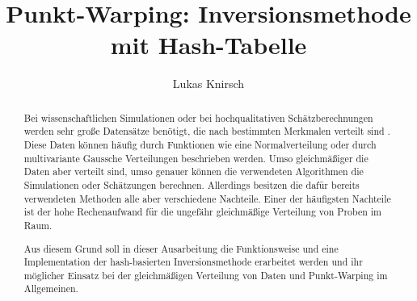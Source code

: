 \documentclass[a4paper]{IEEEtran}
\title{Punkt-Warping: Inversionsmethode mit Hash-Tabelle}
\author{Lukas Knirsch}
\begin{document}
\maketitle

\begin{abstract}
Bei wissenschaftlichen Simulationen oder bei hochqualitativen Schätzberechnungen werden sehr große Datensätze benötigt, 
die nach bestimmten Merkmalen verteilt sind \cite{frisch_hanebeck-deterministic_gaussian_sampling-2021}. Diese Daten 
können häufig durch Funktionen wie eine Normalverteilung oder durch multivariante Gaussche Verteilungen beschrieben werden. 
Umso gleichmäßiger die Daten aber verteilt sind, umso genauer können die verwendeten Algorithmen die Simulationen oder 
Schätzungen berechnen. Allerdings besitzen die dafür bereits verwendeten Methoden alle aber verschiedene Nachteile. Einer 
der häufigsten Nachteile ist der hohe Rechenaufwand für die ungefähr gleichmäßige Verteilung von Proben im Raum. 

Aus diesem Grund soll in dieser Ausarbeitung die Funktionsweise und eine Implementation der hash-basierten 
Inversionsmethode erarbeitet werden und ihr möglicher Einsatz bei der gleichmäßigen Verteilung von Daten und Punkt-Warping 
im Allgemeinen.
\end{abstract}

















\end{document}
